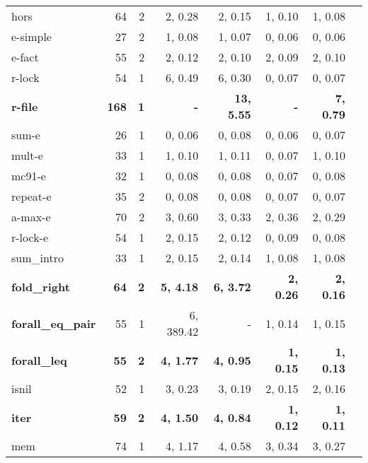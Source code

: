 \begin{table}
\begin{center}
\begin{tabular}{|l|r|r|r|r|r|r|r|}
 hors       &    64&      2& 2, 0.28 & 2, 0.15 & 1, 0.10 & 1, 0.08 \\
 e-simple   &    27&      2& 1, 0.08 & 1, 0.07 & 0, 0.06 & 0, 0.06 \\
 e-fact     &    55&      2& 2, 0.12 & 2, 0.10 & 2, 0.09 & 2, 0.10 \\
 r-lock     &    54&      1& 6, 0.49 & 6, 0.30 & 0, 0.07 & 0, 0.07 \\
\bf  r-file     &\bf    168&\bf       1&\bf  - &\bf  13, 5.55 &\bf  - &\bf  7, 0.79 \\
 sum-e      &    26&      1& 0, 0.06 & 0, 0.08 & 0, 0.06 & 0, 0.07 \\
 mult-e     &    33&      1& 1, 0.10 & 1, 0.11 & 0, 0.07 & 1, 0.10 \\
 mc91-e     &    32&      1& 0, 0.08 & 0, 0.08 & 0, 0.07 & 0, 0.08 \\
 repeat-e   &    35&      2& 0, 0.08 & 0, 0.08 & 0, 0.07 & 0, 0.07 \\
 a-max-e    &    70&      2& 3, 0.60 & 3, 0.33 & 2, 0.36 & 2, 0.29 \\
 r-lock-e   &    54&      1& 2, 0.15 & 2, 0.12 & 0, 0.09 & 0, 0.08 \\
\hline
 sum\_intro        &  33 & 1 & 2, 0.15 & 2, 0.14 & 1, 0.08 & 1, 0.08 \\
\bf  fold\_right       &\bf   64 &\bf  2 &\bf  5, 4.18 &\bf  6, 3.72 &\bf  2, 0.26 &\bf  2, 0.16 \\
\bf forall\_eq\_pair  &  55 & 1 & 6, 389.42 & - & 1, 0.14 & 1, 0.15 \\
\bf  forall\_leq       &\bf   55 &\bf  2 &\bf  4, 1.77 &\bf  4, 0.95 &\bf  1, 0.15 &\bf  1, 0.13 \\
 isnil             &  52 & 1 & 3, 0.23 & 3, 0.19 & 2, 0.15 & 2, 0.16 \\
\bf  iter              &\bf   59 &\bf  2 &\bf  4, 1.50 &\bf  4, 0.84 &\bf  1, 0.12 &\bf  1, 0.11 \\
 mem               &  74 & 1 & 4, 1.17 & 4, 0.58 & 3, 0.34 & 3, 0.27 \\

\end{tabular}
\end{center}
\end{table}
